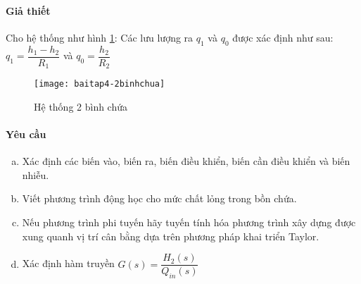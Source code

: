 \paragraph{Giả thiết}
    Cho hệ thống như hình \ref{Fig:baitap4-2binhchua}: Các lưu lượng ra $q_1$ và $q_0$ được xác định như sau: $q_1 = \dfrac{h_1 - h_2}{R_1}$ và $q_0 = \dfrac{h_2}{R_2}$
    \begin{figure}[htp]
        \begin{center}
            \texttt{[image: baitap4-2binhchua]}
        \end{center}
        \caption{Hệ thống 2 bình chứa} \label{Fig:baitap4-2binhchua}
    \end{figure}

\paragraph{Yêu cầu}
    \begin{enumerate}[a.]
        \item Xác định các biến vào, biến ra, biến điều khiển, biến cần điều khiển và biến nhiễu.
        \item Viết phương trình động học cho mức chất lỏng trong bồn chứa.
        \item Nếu phương trình phi tuyến hãy tuyến tính hóa phương trình xây dựng được xung quanh vị trí cân bằng dựa trên phương pháp khai triển Taylor.
        \item Xác định hàm truyền $G(s) = \dfrac{H_2(s)}{Q_{in}(s)}$
    \end{enumerate}

